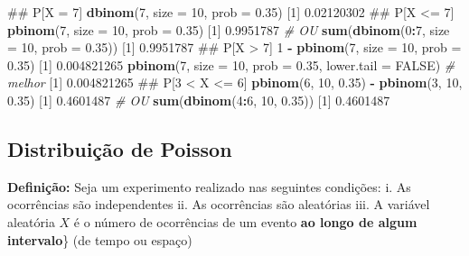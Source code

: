 \documentclass[10pt,a4paper]{book}
\newenvironment{Shaded}{\begin{snugshade}}{\end{snugshade}}
\newcommand{\KeywordTok}[1]{\textcolor[rgb]{0.13,0.29,0.53}{\textbf{#1}}}
\newcommand{\DataTypeTok}[1]{\textcolor[rgb]{0.13,0.29,0.53}{#1}}
\newcommand{\DecValTok}[1]{\textcolor[rgb]{0.00,0.00,0.81}{#1}}
\newcommand{\FloatTok}[1]{\textcolor[rgb]{0.00,0.00,0.81}{#1}}
\newcommand{\StringTok}[1]{\textcolor[rgb]{0.31,0.60,0.02}{#1}}
\newcommand{\CommentTok}[1]{\textcolor[rgb]{0.56,0.35,0.01}{\textit{#1}}}
\newcommand{\OtherTok}[1]{\textcolor[rgb]{0.56,0.35,0.01}{#1}}
\newcommand{\OperatorTok}[1]{\textcolor[rgb]{0.81,0.36,0.00}{\textbf{#1}}}
\newcommand{\NormalTok}[1]{#1}
\begin{document}
\begin{Shaded}
\begin{Highlighting}[]
\NormalTok{## P[X = 7]}
\KeywordTok{dbinom}\NormalTok{(}\DecValTok{7}\NormalTok{, }\DataTypeTok{size =} \DecValTok{10}\NormalTok{, }\DataTypeTok{prob =} \FloatTok{0.35}\NormalTok{)}
\NormalTok{[}\DecValTok{1}\NormalTok{] }\FloatTok{0.02120302}
\NormalTok{## P[X <= 7]}
\KeywordTok{pbinom}\NormalTok{(}\DecValTok{7}\NormalTok{, }\DataTypeTok{size =} \DecValTok{10}\NormalTok{, }\DataTypeTok{prob =} \FloatTok{0.35}\NormalTok{)}
\NormalTok{[}\DecValTok{1}\NormalTok{] }\FloatTok{0.9951787}
\CommentTok{# OU}
\KeywordTok{sum}\NormalTok{(}\KeywordTok{dbinom}\NormalTok{(}\DecValTok{0}\OperatorTok{:}\DecValTok{7}\NormalTok{, }\DataTypeTok{size =} \DecValTok{10}\NormalTok{, }\DataTypeTok{prob =} \FloatTok{0.35}\NormalTok{))}
\NormalTok{[}\DecValTok{1}\NormalTok{] }\FloatTok{0.9951787}
\NormalTok{## P[X > 7]}
\DecValTok{1} \OperatorTok{-}\StringTok{ }\KeywordTok{pbinom}\NormalTok{(}\DecValTok{7}\NormalTok{, }\DataTypeTok{size =} \DecValTok{10}\NormalTok{, }\DataTypeTok{prob =} \FloatTok{0.35}\NormalTok{)}
\NormalTok{[}\DecValTok{1}\NormalTok{] }\FloatTok{0.004821265}
\KeywordTok{pbinom}\NormalTok{(}\DecValTok{7}\NormalTok{, }\DataTypeTok{size =} \DecValTok{10}\NormalTok{, }\DataTypeTok{prob =} \FloatTok{0.35}\NormalTok{, }\DataTypeTok{lower.tail =} \OtherTok{FALSE}\NormalTok{) }\CommentTok{# melhor}
\NormalTok{[}\DecValTok{1}\NormalTok{] }\FloatTok{0.004821265}
\NormalTok{## P[3 < X <= 6]}
\KeywordTok{pbinom}\NormalTok{(}\DecValTok{6}\NormalTok{, }\DecValTok{10}\NormalTok{, }\FloatTok{0.35}\NormalTok{) }\OperatorTok{-}\StringTok{ }\KeywordTok{pbinom}\NormalTok{(}\DecValTok{3}\NormalTok{, }\DecValTok{10}\NormalTok{, }\FloatTok{0.35}\NormalTok{)}
\NormalTok{[}\DecValTok{1}\NormalTok{] }\FloatTok{0.4601487}
\CommentTok{# OU}
\KeywordTok{sum}\NormalTok{(}\KeywordTok{dbinom}\NormalTok{(}\DecValTok{4}\OperatorTok{:}\DecValTok{6}\NormalTok{, }\DecValTok{10}\NormalTok{, }\FloatTok{0.35}\NormalTok{))}
\NormalTok{[}\DecValTok{1}\NormalTok{] }\FloatTok{0.4601487}
\end{Highlighting}
\end{Shaded}

\subsection{Distribuição de
Poisson}\label{distribuiuxe7uxe3o-de-poisson}

\textbf{Definição:} Seja um experimento realizado nas seguintes
condições: i. As ocorrências são independentes ii. As ocorrências são
aleatórias iii. A variável aleatória \(X\) é o número de ocorrências de
um evento \textbf{ao longo de algum intervalo}\} (de tempo ou espaço)
\end{document}
